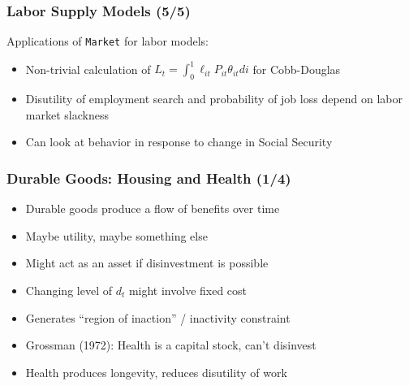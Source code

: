 \documentclass[11pt]{beamer}
\newcommand{\bi}{\begin{itemize}}
\newcommand{\ei}{\end{itemize}}
\begin{document}
\begin{frame}
\frametitle{Labor Supply Models (5/5)}
Applications of \texttt{Market} for labor models:
\bi
\item Non-trivial calculation of $L_t = \int_0^1 \ell_{it} P_{it} \theta_{it} di$ for Cobb-Douglas

\item Disutility of employment search and probability of job loss depend on labor market slackness

\item Can look at behavior in response to change in Social Security
\ei
\end{frame}



\begin{frame}
\frametitle{Durable Goods: Housing and Health (1/4)}

\bi
\item <1-> Durable goods produce a flow of benefits over time

\item <1-> Maybe utility, maybe something else

\item <1-> Might act as an asset if disinvestment is possible

\item <2-> Changing level of $d_t$ might involve fixed cost

\item <2-> Generates ``region of inaction'' / inactivity constraint

\item <3-> Grossman (1972): Health is a capital stock, can't disinvest

\item <3-> Health produces longevity, reduces disutility of work

\ei
\end{frame}
\end{document}
